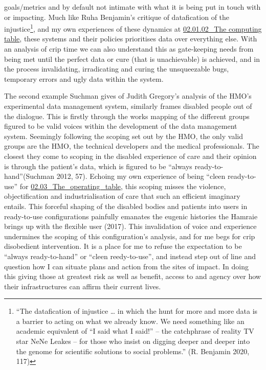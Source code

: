 goals/metrics and by default not intimate with what it is being put in
touch with or impacting. Much like Ruha Benjamin's critique of
datafication of the injustice\footnote{``The datafication of injustice
  \ldots{} in which the hunt for more and more data is a barrier to
  acting on what we already know. We need something like an academic
  equivalent of ``I said what I said!'' -- the catchphrase of reality TV
  star NeNe Leakes -- for those who insist on digging deeper and deeper
  into the genome for scientific solutions to social problems.'' (R.
  Benjamin 2020, 117)}, and my own experiences of these dynamics at
\href{../02_Crip-Tic\%20of\%20vignettes/02.01.02_The\%20computing\%20table.md}{02.01.02\_The
computing table}, these systems and their policies prioritises data over
everything else. With an analysis of crip time we can also understand
this as gate-keeping needs from being met until the perfect data or cure
(that is unachievable) is achieved, and in the process invalidating,
irradicating and curing the unsqueezable bugs, temporary errors and ugly
data within the system.

The second example Suchman gives of Judith Gregory's analysis of the
HMO's experimental data management system, similarly frames disabled
people out of the dialogue. This is firstly through the works mapping of
the different groups figured to be valid voices within the development
of the data management system. Seemingly following the scoping set out
by the HMO, the only valid groups are the HMO, the technical developers
and the medical professionals. The closest they come to scoping in the
disabled experience of care and their opinion is through the patient's
data, which is figured to be ``always ready-to-hand''(Suchman 2012, 57).
Echoing my own experience of being ``cleen ready-to-use'' for
\href{../../02_Crip-Tic_of_Vignettes/sections/02.03_The_operating_table.md}{02.03\_The\_operating\_table},
this scoping misses the violence, objectification and industrialisation
of care that such an efficient imaginary entails. This forceful shaping
of the disabled bodies and patients into users in ready-to-use
configurations painfully emanates the eugenic histories the Hamraie
brings up with the flexible user (2017). This invalidation of voice and
experience undermines the scoping of this configuration's analysis, and
for me begs for crip disobedient intervention. It is a place for me to
refuse the expectation to be ``always ready-to-hand'' or ``cleen
reedy-to-use'', and instead step out of line and question how I can
situate plans and action from the sites of impact. In doing this giving
those at greatest risk as well as benefit, access to and agency over how
their infrastructures can affirm their current lives.


